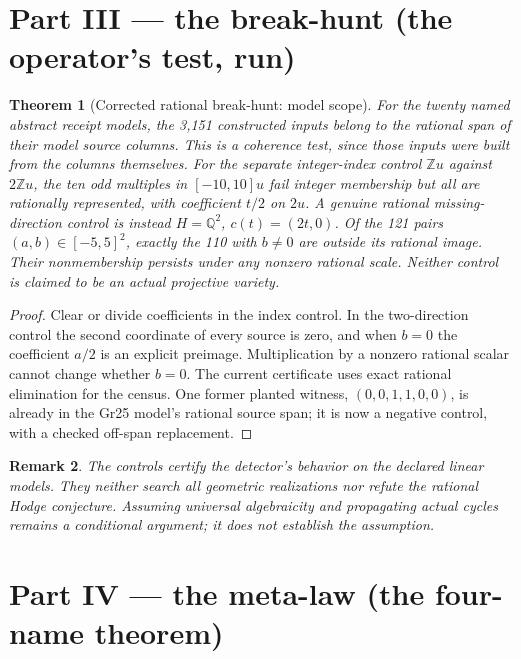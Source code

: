 \documentclass[11pt]{article}
\newtheorem{theorem}{Theorem}[section]
\newtheorem{remark}[theorem]{Remark}
\newcommand{\Q}{\mathbb Q}
\begin{document}
\section{Part III --- the break-hunt (the operator's test, run)}

\begin{theorem}[Corrected rational break-hunt: model scope]
\label{thm:hunt}
For the twenty named abstract receipt models, the 3,151 constructed inputs
belong to the rational span of their model source columns. This is a
coherence test, since those inputs were built from the columns themselves.
For the separate integer-index control $\mathbb Zu$ against $2\mathbb Zu$,
the ten odd multiples in $[-10,10]u$ fail integer membership but all are
rationally represented, with coefficient $t/2$ on $2u$.
A genuine rational missing-direction control is instead
$H=\Q^2$, $c(t)=(2t,0)$. Of the 121 pairs $(a,b)\in[-5,5]^2$,
exactly the 110 with $b\ne0$ are outside its rational image. Their
nonmembership persists under any nonzero rational scale.
Neither control is claimed to be an actual projective variety.
\end{theorem}
\begin{proof}
Clear or divide coefficients in the index control. In the two-direction
control the second coordinate of every source is zero, and when $b=0$
the coefficient $a/2$ is an explicit preimage. Multiplication by a nonzero
rational scalar cannot change whether $b=0$. The current certificate uses
exact rational elimination for the census. One former planted witness,
$(0,0,1,1,0,0)$, is already in the Gr25 model's rational source span;
it is now a negative control, with a checked off-span replacement.
\end{proof}
\begin{remark}
The controls certify the detector's behavior on the declared linear models.
They neither search all geometric realizations nor refute the rational
Hodge conjecture. Assuming universal algebraicity and propagating actual
cycles remains a conditional argument; it does not establish the assumption.
\end{remark}

\section{Part IV --- the meta-law (the four-name theorem)}
\end{document}
